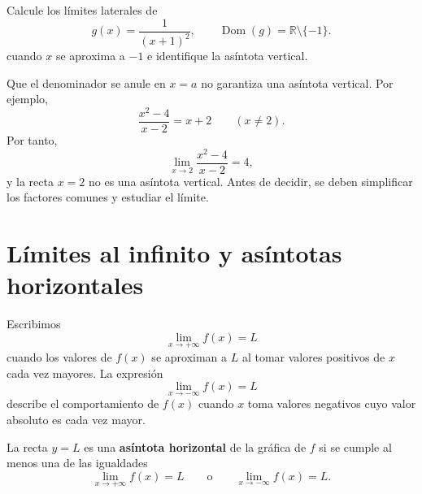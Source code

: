 \documentclass[10pt,a5paper]{article}
\newif\ifmostrarSoluciones
\begin{document}
\begin{ejemplo}
Calcule los límites laterales de
\[
  g(x)=\frac{1}{(x+1)^2},\qquad
  \operatorname{Dom}(g)=\mathbb{R}\setminus\{-1\}.
\]
cuando $x$ se aproxima a $-1$ e identifique la asíntota vertical.
\end{ejemplo}
\ifmostrarSoluciones
\begin{solucion}
Para $x\neq-1$, el denominador $(x+1)^2$ es positivo. Al aproximarse $x$ a $-1$ por cualquiera de los dos lados, el denominador se aproxima a $0$ mediante valores positivos. En consecuencia,
\[
  \lim_{x\to-1^-}\frac{1}{(x+1)^2}
  =\lim_{x\to-1^+}\frac{1}{(x+1)^2}
  =+\infty.
\]
En este caso también podemos escribir
\[
  \lim_{x\to-1}\frac{1}{(x+1)^2}=+\infty.
\]
La recta $x=-1$ es una asíntota vertical.
\end{solucion}
\else\vspace{18mm}\fi

\begin{nota}
Que el denominador se anule en $x=a$ no garantiza una asíntota vertical. Por ejemplo,
\[
  \frac{x^2-4}{x-2}=x+2
  \qquad (x\neq2).
\]
Por tanto,
\[
  \lim_{x\to2}\frac{x^2-4}{x-2}=4,
\]
y la recta $x=2$ no es una asíntota vertical. Antes de decidir, se deben simplificar los factores comunes y estudiar el límite.
\end{nota}

\section*{Límites al infinito y asíntotas horizontales}

\begin{definicion}
Escribimos
\[
  \lim_{x\to+\infty}f(x)=L
\]
cuando los valores de $f(x)$ se aproximan a $L$ al tomar valores positivos de $x$ cada vez mayores. La expresión
\[
  \lim_{x\to-\infty}f(x)=L
\]
describe el comportamiento de $f(x)$ cuando $x$ toma valores negativos cuyo valor absoluto es cada vez mayor.
\end{definicion}

\begin{definicion}
La recta $y=L$ es una \textbf{asíntota horizontal} de la gráfica de $f$ si se cumple al menos una de las igualdades
\[
  \lim_{x\to+\infty}f(x)=L
  \qquad\text{o}\qquad
  \lim_{x\to-\infty}f(x)=L.
\]
\end{definicion}
\end{document}
